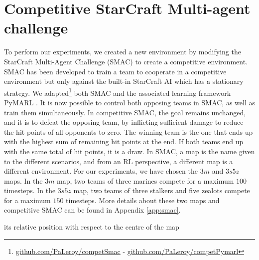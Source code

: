 \section{Competitive StarCraft Multi-agent challenge}
\label{sec:SMAC}

To perform our experiments, we created a new environment by modifying the StarCraft Multi-Agent Challenge (SMAC) \citep{samvelyan2019starcraft} to create a competitive environment. 
SMAC has been developed to train a team to cooperate in a competitive environment but only against the built-in StarCraft AI which has a stationary strategy. 
We adapted\footnote{\label{foot_note_code}\url{github.com/PaLeroy/competSmac} - \url{github.com/PaLeroy/competPymarl}} both SMAC and the associated learning framework PyMARL \citep{samvelyan2019starcraft}.
It is now possible to control both opposing teams in SMAC, as well as train them simultaneously.
In competitive SMAC, the goal remains unchanged, and it is to defeat the opposing team, by inflicting sufficient damage to reduce the hit points of all opponents to zero.
The winning team is the one that ends up with the highest sum of remaining hit points at the end.
If both teams end up with the same total of hit points, it is a draw.
In SMAC, a map is the name given to the different scenarios, and from an RL perspective, a different map is a different environment.
For our experiments, we have chosen the $3m$ and $3s5z$ maps.
In the $3m$ map, two teams of three marines compete for a maximum $100$ timesteps.
In the $3s5z$ map, two teams of three stalkers and five zealots compete for a maximum $150$ timesteps.
More details about these two maps and competitive SMAC can be found in Appendix \ref{app:smac}.


its relative position with respect to the centre of the map 


